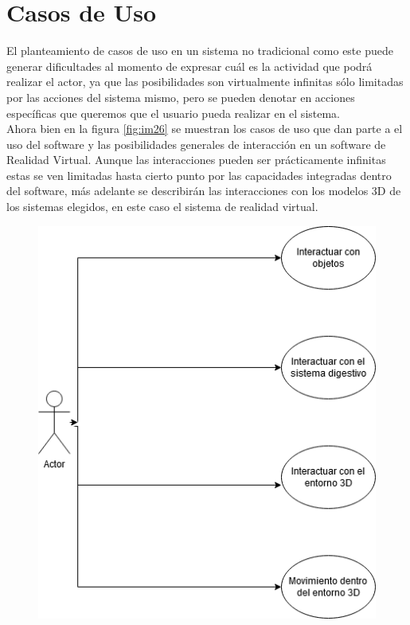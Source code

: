 \section{Casos de Uso}
El planteamiento de casos de uso en un sistema no tradicional como este puede generar dificultades al momento de expresar cuál es la actividad que podrá realizar el actor, 
ya que las posibilidades son virtualmente infinitas sólo limitadas por las acciones del sistema mismo,  pero se pueden denotar en acciones específicas que queremos que el 
usuario pueda realizar en el sistema.\\
Ahora bien en la figura \ref{fig:im26} se muestran los casos de uso que dan parte a el uso del software y las posibilidades generales de interacción en un software de 
Realidad Virtual. Aunque las interacciones pueden ser prácticamente infinitas estas se ven limitadas hasta cierto punto por las capacidades integradas dentro del software, 
más adelante se describirán las interacciones con los modelos 3D de los sistemas elegidos, en este caso el sistema de realidad virtual.\\
\begin{figure}[H]
	\begin{center}
 		\includegraphics[width = .35\textwidth]{source/images/image36.png}
	\end{center} 
\end{figure}

